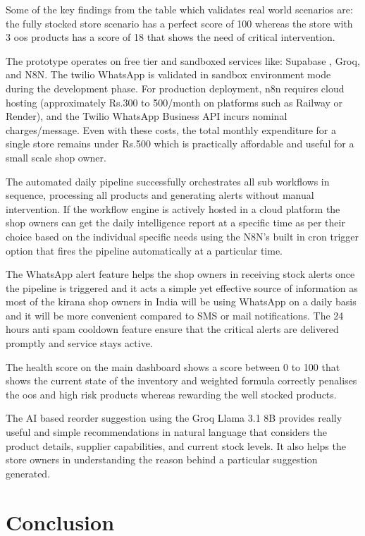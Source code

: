 \documentclass[journal]{IEEEtran}
\begin{document}
Some of the key findings from the table which validates
real world scenarios are: the fully stocked store scenario
has a perfect score of 100 whereas the store with 3 oos 
products has a score of 18 that shows the need of 
critical intervention.

The prototype operates on free tier and sandboxed services like: Supabase , Groq, and N8N. The twilio WhatsApp is validated in sandbox environment mode during the development phase. For production deployment, n8n requires cloud hosting (approximately Rs.300 to 500/month on platforms such as Railway or Render), and the Twilio WhatsApp Business API incurs nominal charges/message. Even with these costs, the total monthly expenditure for a single store remains under Rs.500 which is practically affordable and useful for a small scale shop owner.

The automated daily pipeline successfully orchestrates all sub workflows in sequence, processing all products and generating alerts without manual intervention. If the workflow engine is actively hosted in a cloud platform the shop owners can get the daily intelligence report at a specific time as per their 
choice based on the individual specific needs using the N8N's built in cron trigger option that fires the pipeline automatically at a particular time.

The WhatsApp alert feature helps the shop owners in receiving stock alerts once the pipeline is triggered and it acts a simple yet effective source of information as most of the kirana shop owners in India will be using WhatsApp on a daily basis and it will be more convenient compared to SMS or mail notifications. The 24 hours anti spam cooldown feature ensure that the critical alerts are delivered promptly and service stays active.

The health score on the main dashboard shows a score between 0 to 100 that shows the current state of the inventory and weighted formula correctly penalises the oos and high risk products whereas rewarding the well stocked products.

The AI based reorder suggestion using the Groq Llama 3.1 8B provides really useful and simple recommendations in natural language that considers the product details, supplier capabilities, and current stock levels. It also helps the store owners in understanding the reason behind a particular suggestion generated.

\section{Conclusion}
\end{document}
